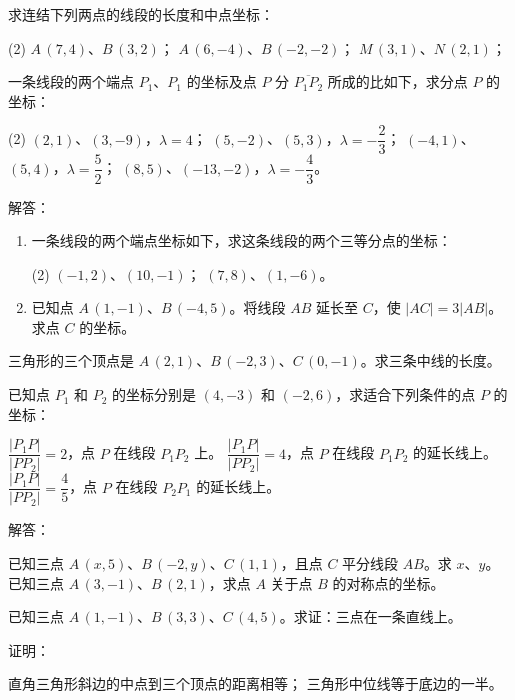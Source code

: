 \begin{Exercise}
\begin{question}
\begin{tasks}
    \end{tasks}
    \item 求连结下列两点的线段的长度和中点坐标：
    \begin{tasks}(2)
      \task $A\,(7,4)$、$B\,(3,2)$；
      \task $A\,(6,-4)$、$B\,(-2,-2)$；
      \task $M\,(3,1)$、$N\,(2,1)$；
    \end{tasks}
    \item 一条线段的两个端点 $P_1$、$P_1$ 的坐标及点 $P$ 分 $\overline{P_1P_2}$ 所成的比如下，求分点 $P$ 的坐标：
    \begin{tasks}(2)
      \task $(2,1)$、$(3,-9)$，$\lambda=4$；
      \task $(5,-2)$、$(5,3)$，$\lambda=-\dfrac{2}{3}$；
      \task $(-4,1)$、$(5,4)$，$\lambda=\dfrac{5}{2}$；
      \task $(8,5)$、$(-13,-2)$，$\lambda=-\dfrac{4}{3}$。
    \end{tasks}
    \item 解答：
    \begin{enumerate}[itemindent=2em]
      \item 一条线段的两个端点坐标如下，求这条线段的两个三等分点的坐标：
      \begin{tasks}(2)
        \task $(-1,2)$、$(10,-1)$；
        \task $(7,8)$、$(1,-6)$。
      \end{tasks}
      \item 已知点 $A\,(1,-1)$、$B\,(-4,5)$。将线段 $AB$ 延长至 $C$，使 $|AC|=3|AB|$。求点 $C$ 的坐标。
    \end{enumerate}
    \item 三角形的三个顶点是 $A\,(2,1)$、$B\,(-2,3)$、$C\,(0,-1)$。求三条中线的长度。
    \item 已知点 $P_1$ 和 $P_2$ 的坐标分别是 $(4,-3)$ 和 $(-2,6)$，求适合下列条件的点 $P$ 的坐标：
    \begin{tasks}
      \task $\dfrac{|P_1P|}{|PP_2|}=2$，点 $P$ 在线段 $P_1P_2$ 上。
      \task $\dfrac{|P_1P|}{|PP_2|}=4$，点 $P$ 在线段 $P_1P_2$ 的延长线上。
      \task $\dfrac{|P_1P|}{|PP_2|}=\dfrac{4}{5}$，点 $P$ 在线段 $P_2P_1$ 的延长线上。
    \end{tasks}
    \item 解答：
    \begin{tasks}
      \task 已知三点 $A\,(x,5)$、$B\,(-2,y)$、$C\,(1,1)$，且点 $C$ 平分线段 $AB$。求 $x$、$y$。
      \task 已知三点 $A\,(3,-1)$、$B\,(2,1)$，求点 $A$ 关于点 $B$ 的对称点的坐标。
    \end{tasks}
    \item 已知三点 $A\,(1,-1)$、$B\,(3,3)$、$C\,(4,5)$。求证：三点在一条直线上。
    \item 证明：
    \begin{tasks}
      \task 直角三角形斜边的中点到三个顶点的距离相等；
      \task 三角形中位线等于底边的一半。
    \end{tasks}
  \end{question}
\end{Exercise}

